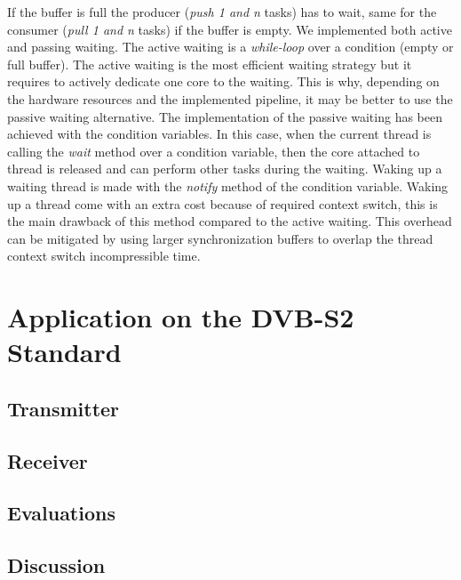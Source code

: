 If the buffer is full the producer (\emph{push 1 and n} tasks) has to wait, same
for the consumer (\emph{pull 1 and n} tasks) if the buffer is empty. We
implemented both active and passing waiting. The active waiting is a
\emph{while-loop} over a condition (empty or full buffer). The active waiting is
the most efficient waiting strategy but it requires to actively dedicate one
core to the waiting. This is why, depending on the hardware resources and the
implemented pipeline, it may be better to use the passive waiting alternative.
The implementation of the passive waiting has been achieved with the 
condition variables. In this case, when the current thread is calling the
\emph{wait} method over a condition variable, then the core attached to thread
is released and can perform other tasks during the waiting. Waking up a waiting
thread is made with the \emph{notify} method of the condition variable. Waking
up a thread come with an extra cost because of required context switch, this is
the main drawback of this method compared to the active waiting. This overhead
can be mitigated by using larger synchronization buffers to overlap the thread
context switch incompressible time.


\section{Application on the DVB-S2 Standard}

\subsection{Transmitter}

\subsection{Receiver}

\subsection{Evaluations}

\subsection{Discussion}

